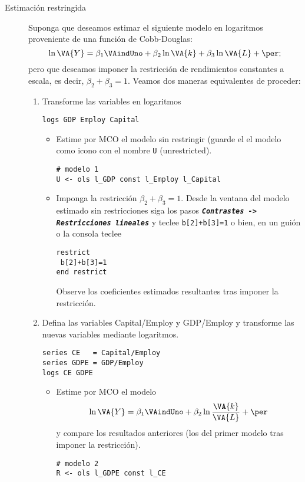 \documentclass[11pt]{article}
\begin{document}
\begin{description}
\item[{Estimación restringida}] Suponga que deseamos estimar el siguiente
modelo en logaritmos proveniente de una función de Cobb-Douglas:
\begin{displaymath}
   \ln \VA{Y} = 
   \beta_1\VAindUno + \beta_2\ln\VA{k} + \beta_3\ln\VA{L} + \per;
\end{displaymath}
pero que deseamos imponer la restricción de rendimientos constantes a
escala, es decir, \(\beta_2+\beta_3=1\). Veamos dos maneras equivalentes
de proceder:

\begin{enumerate}
\item Transforme las variables en logaritmos
\begin{verbatim}
logs GDP Employ Capital
\end{verbatim}
\begin{itemize}
\item Estime por MCO el modelo sin restringir (guarde el el modelo como
icono con el nombre \texttt{U} (unrestricted).
\begin{verbatim}
# modelo 1
U <- ols l_GDP const l_Employ l_Capital
\end{verbatim}
\item Imponga la restricción \(\beta_2+\beta_3=1\). Desde la ventana del
modelo estimado sin restricciones siga los pasos \textbf{\emph{\texttt{Contrastes ->
      Restricciones lineales}}} y teclee \texttt{b[2]+b[3]=1} o bien, en un
guión o la consola teclee
\begin{verbatim}
restrict
 b[2]+b[3]=1
end restrict
\end{verbatim}
Observe los coeficientes estimados resultantes tras imponer la
restricción.
\end{itemize}

\item Defina las variables \textsf{Capital/Employ} y \textsf{GDP/Employ}
y transforme las nuevas variables mediante logaritmos.
\begin{verbatim}
series CE   = Capital/Employ
series GDPE = GDP/Employ
logs CE GDPE
\end{verbatim}
\begin{itemize}
\item Estime por MCO el modelo
\begin{displaymath}
   \ln \VA{Y} = \beta_1\VAindUno + \beta_2 \ln\frac{\VA{k}}{\VA{L}} + \per
\end{displaymath}
y compare los resultados anteriores (los del primer modelo tras
imponer la restricción).
\begin{verbatim}
# modelo 2
R <- ols l_GDPE const l_CE
\end{verbatim}
\end{itemize}
\end{enumerate}


\end{description}
\end{document}
